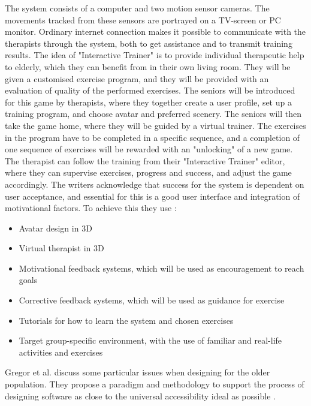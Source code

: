 The system consists of a computer and two motion sensor cameras. The movements tracked from these sensors are portrayed on a TV-screen or PC monitor. Ordinary internet connection makes it possible to communicate with the therapists through the system, both to get assistance and to transmit training results. The idea of "Interactive Trainer" is to provide individual therapeutic help to elderly, which they can benefit from in their own living room. They will be given a customised exercise program, and they will be provided with an evaluation of quality of the performed exercises. The seniors will be introduced for this game by therapists, where they together create a user profile, set up a training program, and choose avatar and preferred scenery. The seniors will then take the game home, where they will be guided by a virtual trainer. The exercises in the program have to be completed in a specific sequence, and a completion of one sequence of exercises will be rewarded with an "unlocking" of a new game. The therapist can follow the training from their "Interactive Trainer" editor, where they can supervise exercises, progress and success, and adjust the game accordingly. The writers acknowledge that success for the system is dependent on user acceptance, and essential for this is a good user interface and integration of motivational factors. To achieve this they use \cite{john2012smartsenior}:

\begin{itemize}
\item Avatar design in 3D
\item Virtual therapist in 3D
\item Motivational feedback systems, which will be used as encouragement  to reach goals
\item Corrective feedback systems, which will be used as guidance for exercise 
\item Tutorials for how to learn the system and chosen exercises
\item Target group-specific environment, with the use of familiar and real-life activities and exercises 
\end{itemize} 

Gregor et al. \cite{gregor} discuss some particular issues when designing for the older population. They propose a paradigm and methodology to support the process of designing software as close to the universal accessibility ideal as possible \cite{gregor}.

